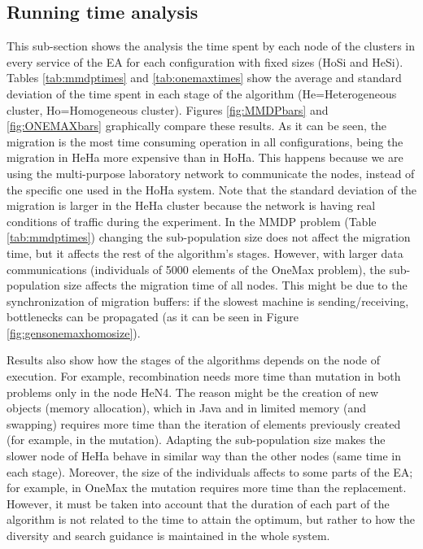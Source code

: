 
\subsection{Running time analysis}

This sub-section shows the analysis the time spent by each node of the clusters
in every %
 service of the EA for each configuration with fixed sizes (HoSi and HeSi). Tables \ref{tab:mmdptimes} and \ref{tab:onemaxtimes} show the average and standard deviation of the time spent in each stage of the algorithm (He=Heterogeneous cluster, Ho=Homogeneous cluster). Figures \ref{fig:MMDPbars} and \ref{fig:ONEMAXbars} graphically compare these results. As it can be seen, the migration is the most time consuming operation in all configurations, being the migration in HeHa more expensive than in HoHa. This happens because we are using the multi-purpose laboratory network to communicate the nodes, instead of the specific one used in the HoHa system. Note that the standard deviation of the migration is larger in the HeHa cluster because the network is having real conditions of traffic during the experiment. In the MMDP problem (Table \ref{tab:mmdptimes}) changing the sub-po\-pu\-la\-tion size does not affect the migration time, but it affects the rest of the algorithm's stages. However, with larger data communications (individuals of 5000 elements of the OneMax problem), the sub-population size affects the migration time of all nodes. This might be due to the synchronization of migration buffers: if the slowest machine is sending/receiving, bottlenecks can be propagated (as it can be seen in Figure \ref{fig:gensonemaxhomosize}). 

Results also show how the stages of the algorithms depends on the node
of execution. For example, recombination needs more time than mutation
in both problems only in the node HeN4. The reason might be the
creation of new objects (memory allocation), which in Java and in
limited memory (and swapping) requires more time than the iteration of
elements previously created (for example, in the mutation). Adapting
the sub-population size makes the slower node of HeHa behave in similar
way than the other nodes (same time in each stage). Moreover, the size
of the individuals affects to some parts of the EA; for example, in 
OneMax the mutation requires more time than the replacement. However,
it must be taken into account that the duration of each part of the
algorithm is not related to the time to attain the optimum, but rather to
how the diversity and search guidance is maintained in the whole system.  

